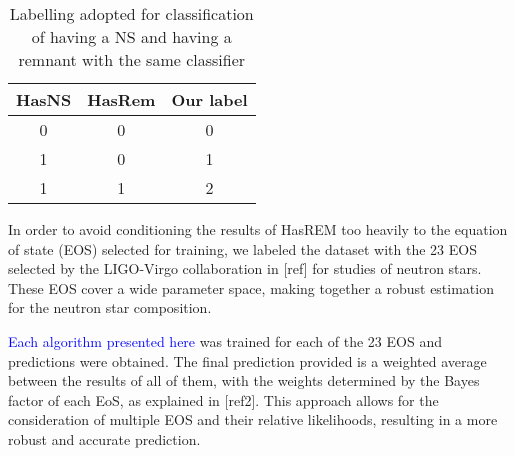 \begin{table}[h]
\centering
\begin{tabular}{@{}ccc@{}}
\toprule
HasNS & HasRem & Our label \\ \midrule
0     & 0      & 0         \\
1     & 0      & 1         \\
1     & 1      & 2         \\ \bottomrule
\end{tabular}
\caption{Labelling adopted for classification of having a NS and having a remnant with the same classifier}
\label{tab:labels}
\end{table}

In order to avoid conditioning the results of HasREM too heavily to the equation of state (EOS) selected for training, we labeled the dataset with the 23 EOS selected by the LIGO-Virgo collaboration in [ref] for studies of neutron stars. These EOS cover a wide parameter space, making together a robust estimation for the neutron star composition.

\textcolor{blue}{Each algorithm presented here} was trained for each of the 23 EOS and predictions were obtained. The final prediction provided is a weighted average between the results of all of them, with the weights determined by the Bayes factor of each EoS, as explained in [ref2]. This approach allows for the consideration of multiple EOS and their relative likelihoods, resulting in a more robust and accurate prediction.

